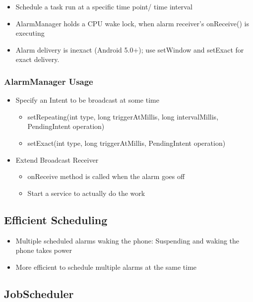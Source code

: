 \documentclass{article}
\begin{document}
\begin{itemize}
  \item Schedule a task run at a specific time point/ time interval 
  \item AlarmManager holds a CPU wake lock, when alarm receiver’s onReceive() is executing 
  \item Alarm delivery is inexact (Android 5.0+); use setWindow and setExact for exact delivery.
\end{itemize}

\subsubsection{AlarmManager Usage}

\begin{itemize}
  \item Specify an Intent to be broadcast at some time
  \begin{itemize}
    \item setRepeating(int type, long triggerAtMillis, long intervalMillis, PendingIntent operation)
    \item setExact(int type, long triggerAtMillis, PendingIntent operation)
  \end{itemize}
  \item Extend Broadcast Receiver
  \begin{itemize}
    \item onReceive method is called when the alarm goes off
    \item Start a service to actually do the work
  \end{itemize}
\end{itemize}

\subsection{Efficient Scheduling}

\begin{itemize}
  \item Multiple scheduled alarms waking the phone: Suspending and waking the phone takes power 
  \item More efficient to schedule multiple alarms at the same time
\end{itemize}

\subsection{JobScheduler}
\end{document}
